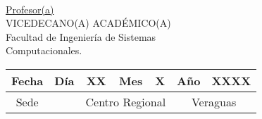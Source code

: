 \\
\begin{minipage}{.4\textwidth} %
  \raggedright
  \underline{Profesor(a)}\\
  VICEDECANO(A) ACADÉMICO(A)\\
  Facultad de Ingeniería de Sistemas\\
  Computacionales.
\end{minipage}
\hfill
\begin{minipage}{.6\textwidth} %
  \raggedleft
  \begin{tabular}{|c|c|c|c|c|c|c|}
    \hline
    \textbf{Fecha} & Día & XX & Mes & X & Año & XXXX \\
    \hline
    Sede & & \multicolumn{3}{c|}{Centro Regional} & \multicolumn{2}{c|}{Veraguas} \\
    \hline
  \end{tabular}
\end{minipage}
